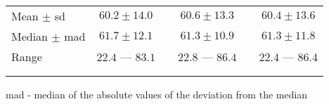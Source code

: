 \documentclass[dvips, 10pt]{article}
\begin{document}
\begin{table}[tbp]
\begin{center}
\begin{tabular}{ @{}l@{}
@{}c@{}@{}p{1.5em}@{}@{}c@{}@{}p{1.5em}@{}@{}c@{}
}
 \hspace{1em} Mean $\pm$ sd &
 $ 60.2 \pm 14.0 $ &&
 $ 60.6 \pm 13.3 $ &&
 $ 60.4 \pm 13.6 $ \\
 \hspace{1em} Median $\pm$ mad &
 $ 61.7 \pm 12.1 $ &&
 $ 61.3 \pm 10.9 $ &&
 $ 61.3 \pm 11.8 $ \\
 \hspace{1em} Range &
 $ 22.4 $ --- $ 83.1 $ &&
 $ 22.8 $ --- $ 86.4 $ &&
 $ 22.4 $ --- $ 86.4 $ \\
 \vspace{0em} \\
\hline \\ 
\end{tabular}

\parbox{ 5in }{ mad - median of the absolute values of the deviation from the median } \\
 \vspace{1em}\end{center}
 \end{table}
\clearpage
\end{document}
